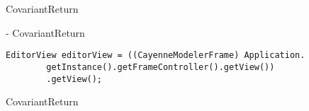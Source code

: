 \begin{pattern}{CovariantReturn}

\instances{}

- CovariantReturn
\begin{verbatim}
EditorView editorView = ((CayenneModelerFrame) Application.
        getInstance().getFrameController().getView())
        .getView();
\end{verbatim}
    
\end{pattern}{CovariantReturn}